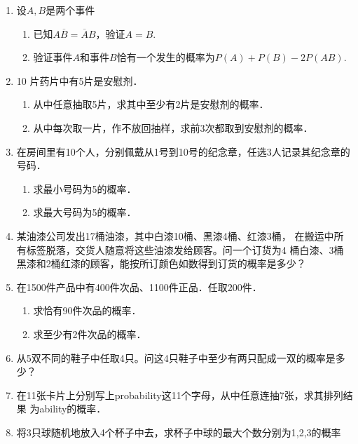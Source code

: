 \documentclass[10pt,a4paper]{article}
\begin{document}
\begin{enumerate}
    \item 设$A,B$是两个事件
    \begin{enumerate}
        \item 已知$A\overline{B}=\overline{A}B$，验证$A=B$.
        \item 验证事件$A$和事件$B$恰有一个发生的概率为$P(A)+P(B)-2P(AB)$.
    \end{enumerate}



    \item 10 片药片中有5片是安慰剂．
    \begin{enumerate}
        \item 从中任意抽取5片，求其中至少有2片是安慰剂的概率．
        \item 从中每次取一片，作不放回抽样，求前3次都取到安慰剂的概率．
    \end{enumerate}



    \item 在房间里有10个人，分别佩戴从1号到10号的纪念章，任选3人记录其纪念章的号码．
    \begin{enumerate}
        \item 求最小号码为5的概率．
        \item 求最大号码为5的概率．
    \end{enumerate}



    \item 某油漆公司发出17桶油漆，其中白漆10桶、黑漆4桶、红漆3桶，
    在搬运中所有标签脱落，交货人随意将这些油漆发给顾客。问一个订货为4
    桶白漆、3桶黑漆和2桶红漆的顾客，能按所订颜色如数得到订货的概率是多少？

    
    \item 在1500件产品中有400件次品、1100件正品．任取200件．
    \begin{enumerate}
        \item 求恰有90件次品的概率．
        \item 求至少有2件次品的概率．
    \end{enumerate}



    \item 从5双不同的鞋子中任取4只。问这4只鞋子中至少有两只配成一双的概率是多少？


    \item 在11张卡片上分别写上probability这11个字母，从中任意连抽7张，求其排列结果
    为ability的概率．


    \item 将3只球随机地放入4个杯子中去，求杯子中球的最大个数分别为1,2,3的概率




\end{enumerate}
\end{document}
